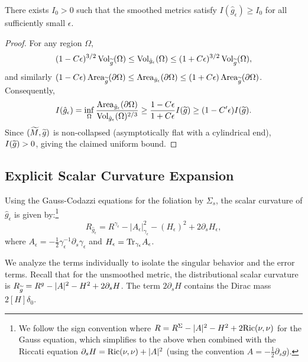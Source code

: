 \begin{corollary}\label{cor:IsoperimetricStabilityAppendix}
There exists $I_0>0$ such that the smoothed metrics satisfy $I(\hat{g}_\epsilon) \ge I_0$ for all sufficiently small $\epsilon$.
\end{corollary}
\begin{proof}
For any region $\Omega$,
\[
    (1-C\epsilon)^{3/2} \operatorname{Vol}_{\widetilde{g}}(\Omega) \le \operatorname{Vol}_{\hat{g}_\epsilon}(\Omega) \le (1+C\epsilon)^{3/2} \operatorname{Vol}_{\widetilde{g}}(\Omega),
\]
and similarly $(1-C\epsilon) \operatorname{Area}_{\widetilde{g}}(\partial \Omega) \le \operatorname{Area}_{\hat{g}_\epsilon}(\partial \Omega) \le (1+C\epsilon) \operatorname{Area}_{\widetilde{g}}(\partial \Omega)$. Consequently,
\[
    I(\hat{g}_\epsilon) = \inf_\Omega \frac{\operatorname{Area}_{\hat{g}_\epsilon}(\partial \Omega)}{\operatorname{Vol}_{\hat{g}_\epsilon}(\Omega)^{2/3}} \ge \frac{1-C\epsilon}{1+C\epsilon} I(\widetilde{g}) \ge (1-C'\epsilon) I(\widetilde{g}).
\]
Since $(\widetilde{M},\widetilde{g})$ is non-collapsed (asymptotically flat with a cylindrical end), $I(\widetilde{g})>0$, giving the claimed uniform bound.
\end{proof}

\subsection{Explicit Scalar Curvature Expansion}
Using the Gauss-Codazzi equations for the foliation by $\Sigma_s$, the scalar curvature of $\hat{g}_\epsilon$ is given by:\footnote{We follow the sign convention where $R = R^{\Sigma} - |A|^2 - H^2 + 2\mathrm{Ric}(\nu,\nu)$ for the Gauss equation, which simplifies to the above when combined with the Riccati equation $\partial_s H = \mathrm{Ric}(\nu,\nu) + |A|^2$ (using the convention $A = -\frac{1}{2}\partial_s g$).}
\begin{equation}\label{eq:GaussCodazziSmoothed}
    R_{\hat{g}_\epsilon} = R^{\gamma_\epsilon} - |A_\epsilon|_{\gamma_\epsilon}^2 - (H_\epsilon)^2 + 2 \partial_s H_\epsilon,
\end{equation}
where $A_\epsilon = -\frac{1}{2} \gamma_\epsilon^{-1} \partial_s \gamma_\epsilon$ and $H_\epsilon = \mathrm{Tr}_{\gamma_\epsilon} A_\epsilon$.

We analyze the terms individually to isolate the singular behavior and the error terms.
Recall that for the unsmoothed metric, the distributional scalar curvature is $R_{\widetilde{g}} = R^g - |A|^2 - H^2 + 2\partial_s H$. The term $2\partial_s H$ contains the Dirac mass $2[H]\delta_0$.

